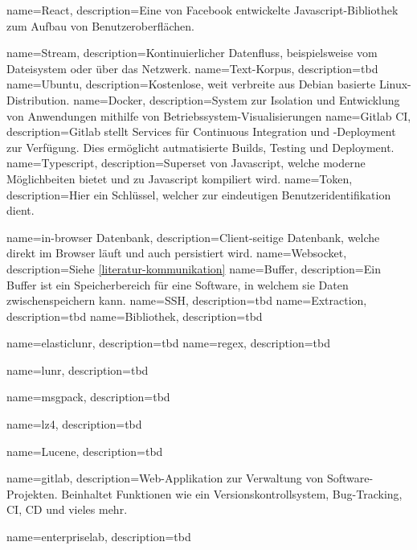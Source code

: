{
    name=React,
    description={Eine von Facebook entwickelte Javascript-Bibliothek zum Aufbau von Benutzeroberflächen.}
}

{
    name=Stream,
    description={Kontinuierlicher Datenfluss, beispielsweise vom Dateisystem oder über das Netzwerk.}
}
{
    name=Text-Korpus,
    description={tbd}
}
{
    name=Ubuntu,
    description={Kostenlose, weit verbreite aus Debian basierte Linux-Distribution.}
}
{
    name=Docker,
    description={System zur Isolation und Entwicklung von Anwendungen mithilfe von Betriebssystem-Visualisierungen}
}
{
    name=Gitlab CI,
    description={Gitlab stellt Services für Continuous Integration und -Deployment zur Verfügung. Dies ermöglicht autmatisierte Builds, Testing und Deployment.}
}
{
    name=Typescript,
    description={Superset von Javascript, welche moderne Möglichbeiten bietet und zu Javascript kompiliert wird.}
}
{
    name=Token,
    description={Hier ein Schlüssel, welcher zur eindeutigen Benutzeridentifikation dient.}
}

{
    name=in-browser Datenbank,
    description={Client-seitige Datenbank, welche direkt im Browser läuft und auch persistiert wird.}
}
{
    name=Websocket,
    description={Siehe \autoref{literatur-kommunikation}}
}
{
    name=Buffer,
    description={Ein Buffer ist ein Speicherbereich für eine Software, in welchem sie Daten zwischenspeichern kann.}
}
{
    name=SSH,
    description={tbd}
}
{
    name=Extraction,
    description={tbd}
}
{
    name=Bibliothek,
    description={tbd}
}

{
    name=elasticlunr,
    description={tbd}
}
{
    name=regex,
    description={tbd}
}

{
    name=lunr,
    description={tbd}
}

{
    name=msgpack,
    description={tbd}
}

{
    name=lz4,
    description={tbd}
}

{
    name=Lucene,
    description={tbd}
}

{
    name=gitlab,
    description={Web-Applikation zur Verwaltung von Software-Projekten. Beinhaltet Funktionen wie ein Versionskontrollsystem, Bug-Tracking, CI, CD und vieles mehr.}
}

{
    name=enterpriselab,
    description={tbd}
}

\renewcommand{\glstextformat}[1]{\textbf{\itshape #1}}




